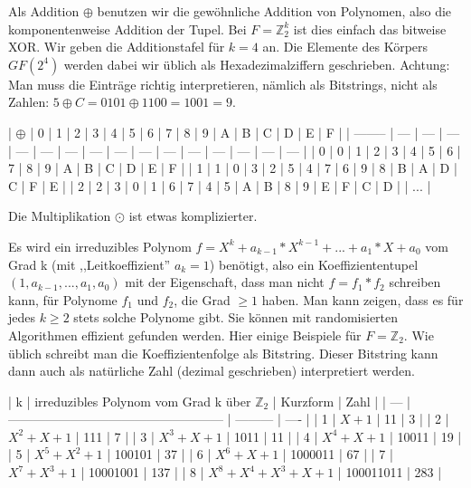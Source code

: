 \documentclass[a4paper]{article}
\begin{document}
\begin{multicols}{3}
Als Addition $\oplus$ benutzen wir die gewöhnliche Addition von Polynomen, also die komponentenweise Addition der Tupel. Bei $F=\mathbb{Z}^k_2$ ist dies einfach das bitweise XOR. Wir geben die Additionstafel für $k=4$ an. Die Elemente des Körpers $GF(2^4)$ werden dabei wir üblich als Hexadezimalziffern geschrieben. Achtung: Man muss die Einträge richtig interpretieren, nämlich als Bitstrings, nicht als Zahlen: $5\oplus C=0101\oplus 1100=1001=9$.

| $\oplus$ | 0   | 1   | 2   | 3   | 4   | 5   | 6   | 7   | 8   | 9   | A   | B   | C   | D   | E   | F |
| -------- | --- | --- | --- | --- | --- | --- | --- | --- | --- | --- | --- | --- | --- | --- | --- |
| 0        | 0   | 1   | 2   | 3   | 4   | 5   | 6   | 7   | 8   | 9   | A   | B   | C   | D   | E   | F |
| 1        | 1   | 0   | 3   | 2   | 5   | 4   | 7   | 6   | 9   | 8   | B   | A   | D   | C   | F   | E |
| 2        | 2   | 3   | 0   | 1   | 6   | 7   | 4   | 5   | A   | B   | 8   | 9   | E   | F   | C   | D |
| ...      |

Die Multiplikation $\odot$ ist etwas komplizierter.

Es wird ein irreduzibles Polynom $f=X^k+a_{k-1}* X^{k-1}+...+a_1*X+a_0$ vom Grad k (mit ,,Leitkoeffizient'' $a_k=1$) benötigt, also ein Koeffiziententupel $(1,a_{k-1},...,a_1,a_0)$ mit der Eigenschaft, dass man nicht $f=f_1*f_2$ schreiben kann, für Polynome $f_1$ und $f_2$, die Grad $\geq 1$ haben. Man kann zeigen, dass es für jedes $k\geq 2$ stets solche Polynome gibt. Sie können mit randomisierten Algorithmen effizient gefunden werden. Hier einige Beispiele für $F=\mathbb{Z}_2$. Wie üblich schreibt man die Koeffizientenfolge als Bitstring. Dieser Bitstring kann dann auch als natürliche Zahl (dezimal geschrieben) interpretiert werden.

| k   | irreduzibles Polynom vom Grad k über $\mathbb{Z}_2$ | Kurzform  | Zahl |
| --- | --------------------------------------------------- | --------- | ---- |
| 1   | $X+ 1$                                              | 11        | 3    |
| 2   | $X^2 +X+ 1$                                         | 111       | 7    |
| 3   | $X^3 +X+ 1$                                         | 1011      | 11   |
| 4   | $X^4 +X+ 1$                                         | 10011     | 19   |
| 5   | $X^5 +X^2 + 1$                                      | 100101    | 37   |
| 6   | $X^6 +X+ 1$                                         | 1000011   | 67   |
| 7   | $X^7 +X^3 + 1$                                      | 10001001  | 137  |
| 8   | $X^8 +X^4 +X^3 +X+ 1$                               | 100011011 | 283  |


\end{multicols}
\end{document}
